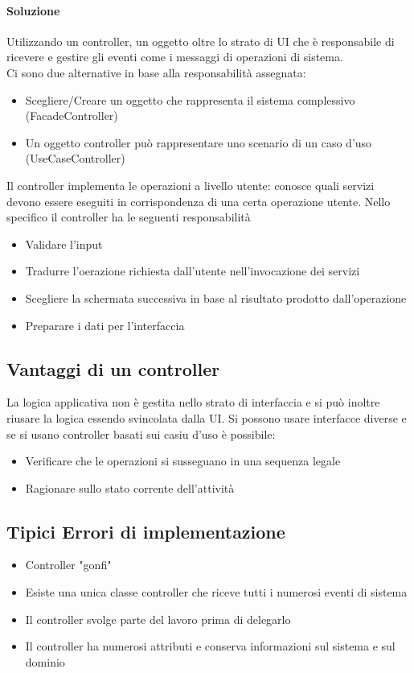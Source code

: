 \paragraph*{Soluzione} Utilizzando un controller, un oggetto oltre lo strato di UI che è 
responsabile di ricevere e gestire gli eventi come i messaggi di operazioni di sistema.
\\ Ci sono due alternative in base alla responsabilità assegnata:
\begin{itemize}
    \item Scegliere/Creare un oggetto che rappresenta il sistema complessivo (FacadeController)
    \item Un oggetto controller può rappresentare uno scenario di un caso d'uso (UseCaseController)
\end{itemize}
Il controller implementa le operazioni a livello utente: conosce quali servizi devono
essere eseguiti in corrispondenza di una certa operazione utente.
Nello specifico il controller ha le seguenti responsabilità
\begin{itemize}
    \item Validare l'input
    \item Tradurre l'oerazione richiesta dall'utente nell'invocazione dei servizi
    \item Scegliere la schermata successiva in base al risultato prodotto dall'operazione
    \item Preparare i dati per l'interfaccia
\end{itemize}
\subsection*{Vantaggi di un controller}
La logica applicativa non è gestita nello strato di interfaccia e si può inoltre
riusare la logica essendo svincolata dalla UI. Si possono usare interfacce diverse e se si usano
controller basati sui casiu d'uso è possibile:
\begin{itemize}
    \item Verificare che le operazioni si susseguano in una sequenza legale
    \item Ragionare sullo stato corrente dell'attività
\end{itemize}
\subsection*{Tipici Errori di implementazione}
\begin{itemize}
    \item Controller "gonfi"
    \item Esiste una unica classe controller che riceve tutti i numerosi eventi di sistema
    \item Il controller svolge parte del lavoro prima di delegarlo
    \item Il controller ha numerosi attributi e conserva informazioni sul sistema e sul dominio
\end{itemize}

